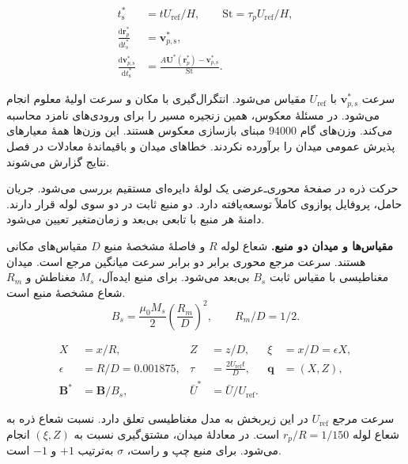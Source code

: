 \begin{equation}
\begin{aligned}
t_{\mathrm s}^*&=t U_{\mathrm{ref}}/H,\qquad
\mathrm{St}=\tau_p U_{\mathrm{ref}}/H,\\
\frac{\mathrm d\mathbf r_p^*}{\mathrm dt_{\mathrm s}^*}
&=\mathbf v_{p,\mathrm s}^*,\\
\frac{\mathrm d\mathbf v_{p,\mathrm s}^*}{\mathrm dt_{\mathrm s}^*}
&=\frac{A\mathbf U^*(\mathbf r_p^*)-\mathbf v_{p,\mathrm s}^*}{\mathrm{St}}.
\end{aligned}
\label{eq:forward-flow-stokes-path}
\end{equation}

سرعت $\mathbf v_{p,\mathrm s}^*$ با $U_{\mathrm{ref}}$ مقیاس می‌شود.
انتگرال‌گیری با مکان و سرعت اولیهٔ معلوم انجام می‌شود.
در مسئلهٔ معکوس، همین زنجیره مسیر را برای ورودی‌های نامزد محاسبه می‌کند.
وزن‌های گام $94000$ مبنای بازسازی معکوس هستند.
این وزن‌ها همهٔ معیارهای پذیرش عمومی میدان را برآورده نکردند.
خطاهای میدان و باقیماندهٔ معادلات در فصل نتایج گزارش می‌شوند.

\label{sec:forward-magnetic-operator}

حرکت ذره در صفحهٔ محوری‌ـ‌عرضی یک لولهٔ دایره‌ای مستقیم بررسی می‌شود.
جریان حامل، پروفایل پوازوی کاملاً توسعه‌یافته دارد.
دو منبع ثابت در دو سوی لوله قرار دارند.
دامنهٔ هر منبع با تابعی بی‌بعد و زمان‌متغیر تعیین می‌شود.

\textbf{مقیاس‌ها و میدان دو منبع.}
شعاع لوله $R$ و فاصلهٔ مشخصهٔ منبع $D$ مقیاس‌های مکانی هستند.
سرعت مرجع محوری برابر دو برابر سرعت میانگین مرجع است.
میدان مغناطیسی با مقیاس ثابت $B_s$ بی‌بعد می‌شود.
برای منبع ایده‌آل، $M_s$ مغناطش و $R_m$ شعاع مشخصهٔ منبع است.
\[
B_s=\frac{\mu_0 M_s}{2}\left(\frac{R_m}{D}\right)^2,
\qquad R_m/D=1/2.
\]

\begin{equation}
\begin{aligned}
X&=x/R,& Z&=z/D,& \xi&=x/D=\epsilon X,\\
\epsilon&=R/D=0.001875,&
\tau&=\frac{2U_{\mathrm{ref}}t}{D},&
\mathbf q&=(X,Z),\\
\mathbf B^*&=\mathbf B/B_s,&
\bar U^*&=\bar U/U_{\mathrm{ref}}.
\end{aligned}
\label{eq:forward-mag-scales}
\end{equation}

سرعت مرجع $U_{\mathrm{ref}}$ در این زیربخش به مدل مغناطیسی تعلق دارد.
نسبت شعاع ذره به شعاع لوله $r_p/R=1/150$ است.
در معادلهٔ میدان، مشتق‌گیری نسبت به $(\xi,Z)$ انجام می‌شود.
برای منبع چپ و راست، $\sigma$ به‌ترتیب $+1$ و $-1$ است.


